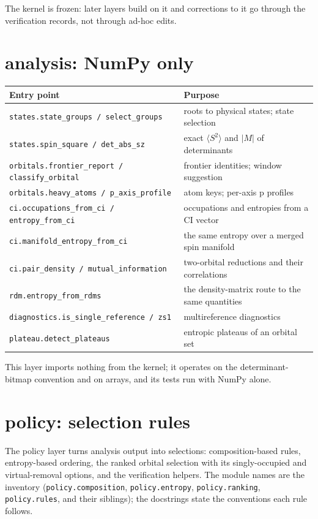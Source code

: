 The kernel is frozen: later layers build on it and corrections to it
go through the verification records, not through ad-hoc edits.

\section{analysis: NumPy only}

\begin{center}
\begin{tabularx}{\textwidth}{lX}
\toprule
Entry point & Purpose \\
\midrule
\texttt{states.state\_groups / select\_groups} & roots to physical states; state selection \\
\texttt{states.spin\_square / det\_abs\_sz} & exact $\langle S^2 \rangle$ and $|M|$ of determinants \\
\texttt{orbitals.frontier\_report / classify\_orbital} & frontier identities; window suggestion \\
\texttt{orbitals.heavy\_atoms / p\_axis\_profile} & atom keys; per-axis p profiles \\
\texttt{ci.occupations\_from\_ci / entropy\_from\_ci} & occupations and entropies from a CI vector \\
\texttt{ci.manifold\_entropy\_from\_ci} & the same entropy over a merged spin manifold \\
\texttt{ci.pair\_density / mutual\_information} & two-orbital reductions and their correlations \\
\texttt{rdm.entropy\_from\_rdms} & the density-matrix route to the same quantities \\
\texttt{diagnostics.is\_single\_reference / zs1} & multireference diagnostics \\
\texttt{plateau.detect\_plateaus} & entropic plateaus of an orbital set \\
\bottomrule
\end{tabularx}
\end{center}

This layer imports nothing from the kernel; it operates on the
determinant-bitmap convention and on arrays, and its tests run with
NumPy alone.

\section{policy: selection rules}

The policy layer turns analysis output into selections: composition-based
rules, entropy-based ordering, the ranked orbital selection with its
singly-occupied and virtual-removal options, and the verification
helpers.  The module names are the inventory
(\texttt{policy.\allowbreak composition}, \texttt{policy.\allowbreak entropy},
\texttt{policy.\allowbreak ranking}, \texttt{policy.\allowbreak rules}, and their siblings);
the docstrings state the conventions each rule follows.

